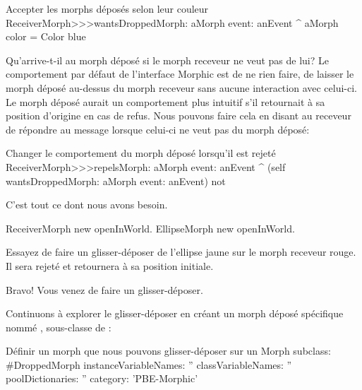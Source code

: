 \documentclass[a4paper,10pt,twoside]{book}
\begin{document}
\begin{method}{Accepter les morphs déposés selon leur couleur}
ReceiverMorph>>>wantsDroppedMorph: aMorph event: anEvent
	^ aMorph color = Color blue
\end{method}

Qu'arrive-t-il au morph déposé si le morph receveur ne veut pas de lui?
Le comportement par défaut de l'interface Morphic est de ne rien
faire, \cad de laisser le morph déposé au-dessus du morph receveur
sans aucune interaction avec celui-ci. 
Le morph déposé aurait un comportement plus intuitif s'il
retournait à sa position d'origine en cas de refus.
Nous pouvons faire cela en disant au receveur de répondre 
au message   lorsque celui-ci ne
veut pas du morph déposé:

\begin{method}{Changer le comportement du morph déposé lorsqu'il est rejeté}
ReceiverMorph>>>repelsMorph: aMorph event: anEvent
	^ (self wantsDroppedMorph: aMorph event: anEvent) not
\end{method}

C'est tout ce dont nous avons besoin.

\begin{code}{}
ReceiverMorph new openInWorld.
EllipseMorph new openInWorld.
\end{code}
\noindent
Essayez de faire un glisser-déposer de l'ellipse jaune
 sur le morph receveur rouge. Il sera rejeté et
retournera à sa position initiale.


Bravo! Vous venez de faire un glisser-déposer.

Continuons à explorer le glisser-déposer en créant un morph
déposé spécifique nommé ,
sous-classe de :

\begin{classdef}{Définir un morph que nous pouvons glisser-déposer sur un }
Morph subclass: #DroppedMorph
	instanceVariableNames: ''
	classVariableNames: ''
	poolDictionaries: ''
	category: 'PBE-Morphic'
\end{classdef}
\end{document}
